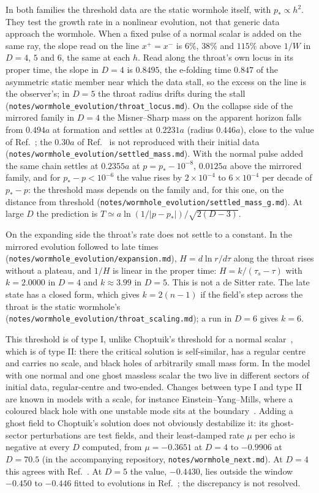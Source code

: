 \documentclass[11pt]{article}
\theoremstyle{remark}
\begin{document}
In both families the threshold data are the static wormhole itself, with $p_*\propto h^2$. They test the growth rate in
a nonlinear evolution, not that generic data approach the wormhole. When a fixed pulse of a normal scalar is added on the
same ray, the slope read on the line $x^+=x^-$ is $6\%$, $38\%$ and $115\%$ above $1/W$ in $D=4$, $5$ and $6$, the same at each $h$. Read along the throat's own locus in its proper time, the slope in $D=4$ is $0.8495$, the
e-folding time $0.847$ of the asymmetric static member near which the data stall, so the excess on the line is the
observer's; in $D=5$ the throat radius drifts during the stall (\texttt{notes/wormhole\_evolution/throat\_locus.md}). On the collapse side of the
mirrored family in $D=4$ the Misner--Sharp mass on the apparent horizon falls from $0.494a$ at formation and settles at
$0.2231a$ (radius $0.446a$), close to the value of Ref.~\cite{GGS2009b}; the $0.30a$ of Ref.~\cite{SH2002} is not
reproduced with their initial data (\texttt{notes/wormhole\_evolution/settled\_mass.md}). With the normal pulse added the
same chain settles at $0.2355a$ at $p=p_*-10^{-8}$, $0.0125a$ above the mirrored family, and for $p_*-p<10^{-6}$ the value
rises by $2\times10^{-4}$ to $6\times10^{-4}$ per decade of $p_*-p$: the threshold mass depends on the family and, for this one,
on the distance from threshold (\texttt{notes/wormhole\_evolution/settled\_mass\_g.md}). At large $D$ the prediction is
$T\simeq a\ln(1/|p-p_*|)/\sqrt{2(D-3)}$.

On the expanding side the throat's rate does not settle to a constant. In the mirrored evolution followed to late times
(\texttt{notes/wormhole\_evolution/expansion.md}), $H=d\ln r/d\tau$ along the throat rises without a plateau, and $1/H$ is
linear in the proper time: $H=k/(\tau_s-\tau)$ with $k=2.0000$ in $D=4$ and $k\approx3.99$ in $D=5$. This is not a de Sitter
rate. The late state has a closed form, which gives $k=2(n-1)$ if the field's step across the throat is the static
wormhole's (\texttt{notes/wormhole\_evolution/throat\_scaling.md}); a run in $D=6$ gives $k=6$.

This threshold is of type I, unlike Choptuik's threshold for a normal scalar~\cite{Choptuik1993}, which is of type II:
there the critical solution is self-similar, has a regular centre and carries no scale, and black holes of arbitrarily
small mass form. In the model with one normal and one ghost massless scalar the two live in different sectors of
initial data, regular-centre and two-ended. Changes between type I and type II are known in models with a scale, for
instance Einstein--Yang--Mills, where a coloured black hole with one unstable mode sits at the boundary~\cite{CHM1999}.
Adding a ghost field to Choptuik's solution does not obviously destabilize it: its ghost-sector perturbations are test
fields, and their least-damped rate $\mu$ per echo is negative at every $D$ computed, from $\mu=-0.3651$ at $D=4$ to
$-0.9906$ at $D=70.5$ (in the accompanying repository, \texttt{notes/wormhole\_next.md}). At $D=4$ this agrees with
Ref.~\cite{GMG1996}. At $D=5$ the value, $-0.4430$, lies outside the window $-0.450$ to $-0.446$ fitted to evolutions in
Ref.~\cite{MGM2026}; the discrepancy is not resolved.
\end{document}
